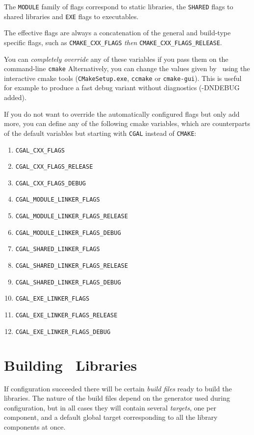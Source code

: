 The \texttt{MODULE} family of flags correspond to static libraries, the \texttt{SHARED} flags to shared libraries
and \texttt{EXE} flags to executables.

The effective flags are always a concatenation of the general and build-type specific flags, such as
\texttt{CMAKE\_CXX\_FLAGS} {\em then} \texttt{CMAKE\_CXX\_FLAGS\_RELEASE}.

You can {\em completely override} any of these variables if you pass them on the command-line \texttt{cmake}
Alternatively, you can change the values given by \cmake\ using the
interactive cmake tools (\texttt{CMakeSetup.exe}, \texttt{ccmake} or \texttt{cmake-gui}).  This is useful for example to produce a fast debug
variant without diagnostics (-DNDEBUG added). 

If you do not want to override the automatically configured flags but only add more, you can 
define any of the following cmake variables, which are counterparts of the default
variables but starting with \texttt{CGAL} instead of \texttt{CMAKE}:

\begin{enumerate}
\item \texttt{CGAL\_CXX\_FLAGS}
\item \texttt{CGAL\_CXX\_FLAGS\_RELEASE}
\item \texttt{CGAL\_CXX\_FLAGS\_DEBUG}
\item \texttt{CGAL\_MODULE\_LINKER\_FLAGS}
\item \texttt{CGAL\_MODULE\_LINKER\_FLAGS\_RELEASE}
\item \texttt{CGAL\_MODULE\_LINKER\_FLAGS\_DEBUG}
\item \texttt{CGAL\_SHARED\_LINKER\_FLAGS}
\item \texttt{CGAL\_SHARED\_LINKER\_FLAGS\_RELEASE}
\item \texttt{CGAL\_SHARED\_LINKER\_FLAGS\_DEBUG}
\item \texttt{CGAL\_EXE\_LINKER\_FLAGS}
\item \texttt{CGAL\_EXE\_LINKER\_FLAGS\_RELEASE}
\item \texttt{CGAL\_EXE\_LINKER\_FLAGS\_DEBUG}
\end{enumerate}


\section{Building \cgal\ Libraries}

If configuration succeeded there will be certain {\em build files} ready to build the libraries.
The nature of the build files depend on the generator used during configuration, but in all cases they 
will contain several {\em targets}, one per component,  and a default global target corresponding 
to all the library components at once.

